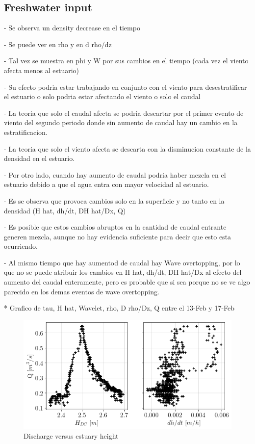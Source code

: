 \documentclass[tesis.tex]{subfiles}
\begin{document}
\subsection{Freshwater input}

- Se observa un density decrease en el tiempo

- Se puede ver en rho y en d rho/dz 

- Tal vez se muestra en phi y W por sus cambios en el tiempo (cada vez el viento afecta menos al estuario)

- Su efecto podria estar trabajando en conjunto con el viento para desestratificar el estuario o solo podria estar afectando el viento o solo el caudal

- La teoria que solo el caudal afecta se podria descartar por el primer evento de viento del segundo periodo donde sin aumento de caudal hay un cambio en la estratificacion.

- La teoria que solo el viento afecta se descarta con la disminucion constante de la densidad en el estuario.

- Por otro lado, cuando hay aumento de caudal podria haber mezcla en el estuario debido a que el agua entra con mayor velocidad al estuario.

- Es se observa que provoca cambios solo en la superficie y no tanto en la densidad (H hat, dh/dt, DH hat/Dx, Q)

- Es posible que estos cambios abruptos en la cantidad de caudal entrante generen mezcla, aunque no hay evidencia suficiente para decir que esto esta ocurriendo.

- Al mismo tiempo que hay aumentod de caudal hay Wave overtopping, por lo que no se puede atribuir los cambios en H hat, dh/dt, DH hat/Dx al efecto del aumento del caudal enteramente, pero es probable que si sea porque no se ve algo parecido en los demas eventos de wave overtopping.

* Grafico de tau, H hat, Wavelet, rho, D rho/Dz, Q entre el 13-Feb y 17-Feb

\begin{figure}[h!]
    \centering
    \includegraphics[width=\textwidth]{Imagenes/qh.png}
    \caption{Discharge versus estuary height }
    \label{fig:qh}
\end{figure}
\end{document}
